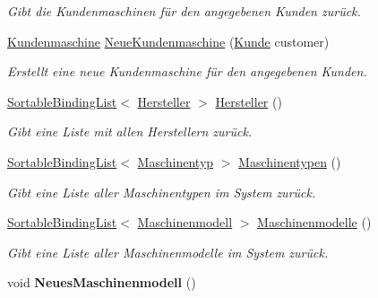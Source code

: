 \begin{DoxyCompactItemize}
\begin{DoxyCompactList}\small\item\em Gibt die Kundenmaschinen für den angegebenen Kunden zurück. \end{DoxyCompactList}\item 
\hyperlink{class_products_1_1_model_1_1_entities_1_1_kundenmaschine}{Kundenmaschine} \hyperlink{class_products_1_1_model_1_1_model_service_a92b6804ae609d312007ee9ef56434aa6}{Neue\+Kundenmaschine} (\hyperlink{class_products_1_1_model_1_1_entities_1_1_kunde}{Kunde} customer)
\begin{DoxyCompactList}\small\item\em Erstellt eine neue Kundenmaschine für den angegebenen Kunden. \end{DoxyCompactList}\item 
\hyperlink{class_products_1_1_common_1_1_sortable_binding_list}{Sortable\+Binding\+List}$<$ \hyperlink{class_products_1_1_model_1_1_entities_1_1_hersteller}{Hersteller} $>$ \hyperlink{class_products_1_1_model_1_1_model_service_af7d975c7e36b74be5f5336e255b674b7}{Hersteller} ()
\begin{DoxyCompactList}\small\item\em Gibt eine Liste mit allen Herstellern zurück. \end{DoxyCompactList}\item 
\hyperlink{class_products_1_1_common_1_1_sortable_binding_list}{Sortable\+Binding\+List}$<$ \hyperlink{class_products_1_1_model_1_1_entities_1_1_maschinentyp}{Maschinentyp} $>$ \hyperlink{class_products_1_1_model_1_1_model_service_ab3e139eda287d85f54f51f5feb65d1a0}{Maschinentypen} ()
\begin{DoxyCompactList}\small\item\em Gibt eine Liste aller Maschinentypen im System zurück. \end{DoxyCompactList}\item 
\hyperlink{class_products_1_1_common_1_1_sortable_binding_list}{Sortable\+Binding\+List}$<$ \hyperlink{class_products_1_1_model_1_1_entities_1_1_maschinenmodell}{Maschinenmodell} $>$ \hyperlink{class_products_1_1_model_1_1_model_service_a39c4c6e35a63159c33769ceef3a49f51}{Maschinenmodelle} ()
\begin{DoxyCompactList}\small\item\em Gibt eine Liste aller Maschinenmodelle im System zurück. \end{DoxyCompactList}\item 
void {\bfseries Neues\+Maschinenmodell} ()\hypertarget{class_products_1_1_model_1_1_model_service_a0ebeb8583da3e349045a11a75c9c465b}{}\label{class_products_1_1_model_1_1_model_service_a0ebeb8583da3e349045a11a75c9c465b}


\end{DoxyCompactItemize}
